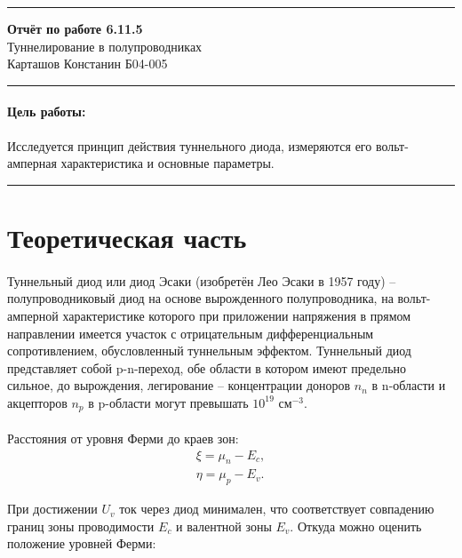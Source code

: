 \documentclass[a4paper,12pt]{article} %
\begin{document}


\hrule 	
\medskip
\begin{raggedright}
{\large \textbf{Отчёт по работе 6.11.5}}
\\
\medskip
{\Large Туннелирование в полупроводниках} 
\\
\medskip
{\large Карташов Констанин Б04-005}
\medskip
\hrule
\medskip
\end{raggedright}


\paragraph{Цель работы:} 
Исследуется принцип действия туннельного диода, измеряются его вольт-амперная характеристика и основные параметры.

\medskip\hrule\medskip

\section{Теоретическая часть}

\paragraph{}
	Туннельный диод или диод Эсаки (изобретён Лео Эсаки в 1957 году) -- полупроводниковый диод на основе вырожденного полупроводника, на вольт-амперной характеристике которого при приложении напряжения в прямом направлении имеется участок с отрицательным дифференциальным сопротивлением, обусловленный туннельным эффектом. Туннельный диод представляет собой p-n-переход, обе области в котором имеют предельно сильное, до вырождения, легирование -- концентрации доноров $n_n$ в n-области и акцепторов $n_p$ в p-области могут превышать $10^{19}$ см$^{-3}$.

\paragraph{}
	Расстояния от уровня Ферми до краев зон:
	\begin{equation}
		\begin{gathered}
			\xi = \mu_n - E_c,\\
			\eta = \mu_p - E_v.
		\end{gathered}
	\end{equation}

	 При достижении $U_v$ ток через диод минимален, что соответствует совпадению границ зоны проводимости $E_c$ и валентной зоны $E_v$. Откуда можно оценить положение уровней Ферми:
	 
\end{document}
